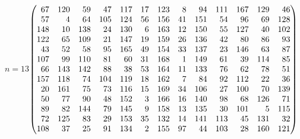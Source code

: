 \documentclass[11pt,a4paper]{article}
\theoremstyle{plain}
\theoremstyle{definition}
\theoremstyle{remark}
\begin{document}
{\noindent\hfill $n=13$\quad$\left(\begin{array}{@{}rrrrrrrrrrrrr@{}}67&120&59&47&117&17&123&8&94&111&167&129&46\\57&4&64&105&124&56&156&41&151&54&96&69&128\\148&10&138&24&130&6&163&12&150&55&127&40&102\\122&65&109&21&147&19&159&26&136&42&80&86&93\\43&52&58&95&165&49&154&33&137&23&146&63&87\\107&99&110&81&60&31&168&1&149&61&39&114&85\\66&143&142&88&38&53&164&11&133&76&62&78&51\\157&118&74&104&119&18&162&7&84&92&112&22&36\\20&161&75&73&116&15&169&34&106&27&100&70&139\\50&77&90&48&152&3&166&16&140&98&68&126&71\\89&82&144&79&145&9&158&13&135&30&101&5&115\\72&125&83&29&153&35&132&14&141&113&45&131&32\\108&37&25&91&134&2&155&97&44&103&28&160&121\end{array}\right)$\hfill\null\par\medskip
}
\end{document}
